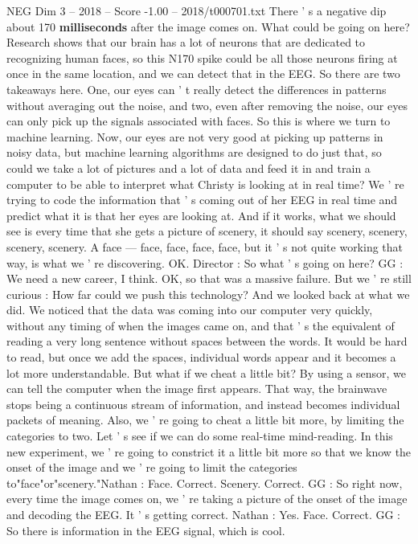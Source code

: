 \begin{textsample}{NEG Dim 3 – 2018 – Score -1.00 – 2018/t000701.txt}
There ' s a negative dip about 170 \textbf{milliseconds} after the image comes on.
What could be going on here?
Research shows that our brain has a lot of neurons that are dedicated to recognizing human faces, so this N170 spike could be all those neurons firing at once in the same location, and we can detect that in the EEG.
So there are two takeaways here.
One, our eyes can ' t really detect the differences in patterns without averaging out the noise, and two, even after removing the noise, our eyes can only pick up the signals associated with faces.
So this is where we turn to machine learning.
Now, our eyes are not very good at picking up patterns in noisy data, but machine learning algorithms are designed to do just that, so could we take a lot of pictures and a lot of data and feed it in and train a computer to be able to interpret what Christy is looking at in real time?
We ' re trying to code the information that ' s coming out of her EEG in real time and predict what it is that her eyes are looking at.
And if it works, what we should see is every time that she gets a picture of scenery, it should say scenery, scenery, scenery, scenery.
A face — face, face, face, face, but it ' s not quite working that way, is what we ' re discovering.
OK.
Director : So what ' s going on here?
GG : We need a new career, I think.
OK, so that was a massive failure.
But we ' re still curious : How far could we push this technology?
And we looked back at what we did.
We noticed that the data was coming into our computer very quickly, without any timing of when the images came on, and that ' s the equivalent of reading a very long sentence without spaces between the words.
It would be hard to read, but once we add the spaces, individual words appear and it becomes a lot more understandable.
But what if we cheat a little bit?
By using a sensor, we can tell the computer when the image first appears.
That way, the brainwave stops being a continuous stream of information, and instead becomes individual packets of meaning.
Also, we ' re going to cheat a little bit more, by limiting the categories to two.
Let ' s see if we can do some real-time mind-reading.
In this new experiment, we ' re going to constrict it a little bit more so that we know the onset of the image and we ' re going to limit the categories to"face"or"scenery."Nathan : Face.
Correct.
Scenery.
Correct.
GG : So right now, every time the image comes on, we ' re taking a picture of the onset of the image and decoding the EEG.
It ' s getting correct.
Nathan : Yes.
Face.
Correct.
GG : So there is information in the EEG signal, which is cool.

\end{textsample}
